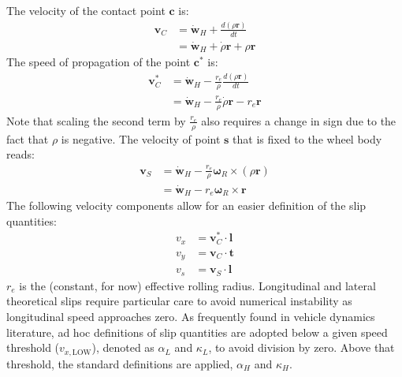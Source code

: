 The velocity of the contact point $\mathbf{c}$ is:
\begin{equation}
    \begin{split}
        \mathbf{v}_{C} &= \dot{\mathbf{w}}_H + \frac{d\left(\rho\mathbf{r}\right)}{dt} \\
        &= \dot{\mathbf{w}}_H + \dot{\rho}\mathbf{r} + \rho\mathbf{r}
    \end{split}
\end{equation}
The speed of propagation of the point $\mathbf{c}^*$ is:
\begin{equation}
    \begin{split}
        \mathbf{v}_{C}^* &= \dot{\mathbf{w}}_H - \frac{r_e}{\rho}\frac{d\left(\rho\mathbf{r}\right)}{dt} \\
        &= \dot{\mathbf{w}}_H - \frac{r_e}{\rho}\dot{\rho}\mathbf{r} - r_e\mathbf{r}
    \end{split}
\end{equation}
Note that scaling the second term by $\frac{r_e}{\rho}$ also requires a change in sign due to the fact that $\rho$ is negative.
The velocity of point $\mathbf{s}$ that is fixed to the wheel body reads:
\begin{equation}
    \begin{split}
        \mathbf{v}_{S} &= \dot{\mathbf{w}}_H - \frac{r_e}{\rho} \boldsymbol{\omega}_R \times \left(\rho\mathbf{r}\right) \\
        &= \dot{\mathbf{w}}_H - r_e \boldsymbol{\omega}_R \times \mathbf{r}
    \end{split}
\end{equation}
The following velocity components allow for an easier definition of the slip quantities:
\begin{equation}
    \begin{split}
        v_x &= \mathbf{v}_{C}^* \cdot \mathbf{l} \\
        v_y &= \mathbf{v}_{C} \cdot \mathbf{t} \\
        v_s &= \mathbf{v}_{S} \cdot \mathbf{l}
    \end{split}
\end{equation}
$r_e$ is the (constant, for now) effective rolling radius.
Longitudinal and lateral theoretical slips require particular care to avoid numerical instability as longitudinal speed approaches zero. As frequently found in vehicle dynamics literature, ad hoc definitions of slip quantities are adopted below a given speed threshold ($v_{x, \text{LOW}}$), denoted as $\alpha_L$ and $\kappa_L$, to avoid division by zero. Above that threshold, the standard definitions are applied, $\alpha_H$ and $\kappa_H$.
